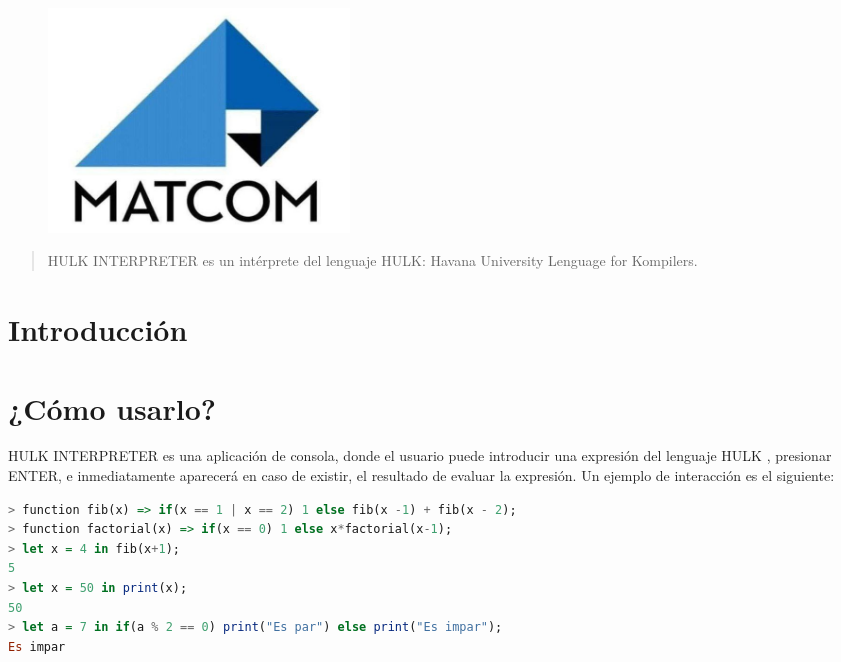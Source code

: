 \documentclass[a4paper, 12pt]{article}
\begin{document}
\begin{center}
\\
\vspace {2cm}
\\
\vspace {1cm}
\\
\vspace {0.5cm}
\\
\vspace {10cm}
\begin{figure}[h]
       \center
       \includegraphics[width=8cm]{matcom.jpg}
\end{figure}
\end{center}

\newpage
\begin{abstract}
HULK INTERPRETER es un intérprete del lenguaje HULK: Havana University Lenguage for Kompilers.
\end{abstract}
\tableofcontents
\newpage

\section{Introducción}\label{sec;intro}



\newpage
\section{¿Cómo usarlo?}

HULK INTERPRETER  es una aplicación de consola, donde el usuario puede introducir una expresión del lenguaje HULK , presionar ENTER, e inmediatamente aparecerá en caso de existir, el resultado de evaluar la expresión. Un ejemplo de interacción es el siguiente:

\begin{lstlisting}[language= Haskell]
> function fib(x) => if(x == 1 | x == 2) 1 else fib(x -1) + fib(x - 2);  
> function factorial(x) => if(x == 0) 1 else x*factorial(x-1);  
> let x = 4 in fib(x+1);
5
> let x = 50 in print(x);
50
> let a = 7 in if(a % 2 == 0) print("Es par") else print("Es impar");
Es impar
\end{lstlisting}
\end{document}
